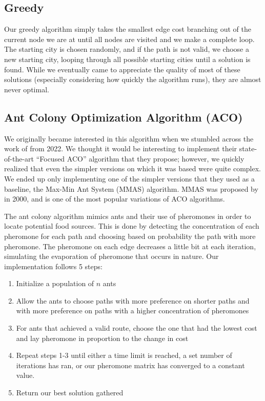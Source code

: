 \subsection*{Greedy}
Our greedy algorithm simply takes the smallest edge cost branching out of the
current node we are at until all nodes are visited and we make a complete loop.
The starting city is chosen randomly, and if the path is not valid, we choose
a new starting city, looping through all possible starting cities until a
solution is found. While we eventually came to appreciate the quality of most
of these solutions (especially considering how quickly the algorithm runs), they
are almost never optimal.

\subsection*{Ant Colony Optimization Algorithm (ACO)}
We originally became interested in this algorithm when we stumbled across the
work of \cite{Skinderowicz_2022} from 2022. We thought it would be interesting
to implement their state-of-the-art ``Focused ACO'' algorithm that they propose;
however, we quickly realized that even the simpler versions on which it was based
were quite complex. We ended up only implementing one of the simpler versions
that they used as a baseline, the Max-Min Ant System (MMAS) algorithm. MMAS
was proposed by \cite{Sttzle2000MAXMINAS} in 2000, and is one of the most popular
variations of ACO algorithms.

The ant colony algorithm \cite{Skinderowicz_2022} mimics ants and their use of 
pheromones in order to locate potential food sources. This is done by detecting 
the concentration of each pheromone for each path and choosing based on 
probability the path with more pheromone. The pheromone on each edge decreases 
a little bit at each iteration, simulating the evaporation of pheromone that
occurs in nature.
Our implementation follows 5 steps:

\begin{enumerate}
  \item Initialize a population of $n$ ants
  \item Allow the ants to choose paths with more preference on shorter paths and
  with more preference on paths with a higher concentration of pheromones
  \item For ants that achieved a valid route, choose the one that had the lowest 
  cost \cite{Sttzle2000MAXMINAS} and lay pheromone in proportion to the change 
  in cost
  \item Repeat steps 1-3 until either a time limit is reached, a set number of 
  iterations has ran, or our pheromone matrix has converged to a constant value.
  \item Return our best solution gathered
\end{enumerate}

